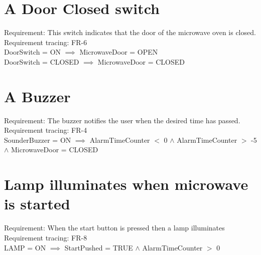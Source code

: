 \section{A Door Closed switch}
Requirement: This switch indicates that the door of the microwave oven is  closed.\\

Requirement tracing: FR-6\\

DoorSwitch = ON  $\implies$ MicrowaveDoor = OPEN  \\
DoorSwitch = CLOSED $\implies$ MicrowaveDoor = CLOSED \\


\section{A Buzzer}
Requirement: The buzzer notifies the user when the desired time has passed. \\
 
 Requirement tracing: FR-4\\
 
SounderBuzzer = ON $\implies$ AlarmTimeCounter $<$ 0 $\wedge$ AlarmTimeCounter $>$ -5 $\wedge$ MicrowaveDoor = CLOSED \\

\section{Lamp illuminates when microwave is started}
Requirement: When the start button is pressed then a lamp illuminates \\

 Requirement tracing: FR-8\\
 
LAMP = ON $\implies$ StartPushed = TRUE $\wedge$ AlarmTimeCounter $>$ 0 

